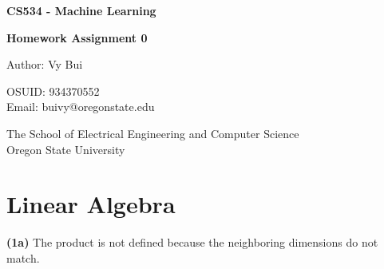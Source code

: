 \documentclass[12pt,article]{article}
\newcommand\projnumber{0}
\begin{document}
\begin{titlepage}
    \begin{center}
        \vspace*{4cm}

        \textbf{\Large CS534 - Machine Learning}

        \vspace{0.5cm}
 
        \textbf{\Large Homework Assignment \projnumber{}}
 
        \vspace{1cm}

        Author: Vy Bui

        OSUID: 934370552 \\ 
        
        Email: buivy@oregonstate.edu

        \vfill
             
        \vspace{0.8cm}
      
             
        The School of Electrical Engineering and Computer Science\\
        Oregon State University\\
             
    \end{center}
\end{titlepage}

\newpage
\section*{Linear Algebra}
\textbf{(1a)} The product is not defined because the neighboring dimensions do 
not match.
\end{document}
